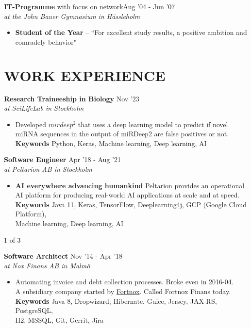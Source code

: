 \documentclass[overlapped]{res}
\begin{document}
\begin{resume}
{\bf  IT-Programme} with focus on network\hfill Aug '04 - Jun '07\\
{\sl at the John Bauer Gymnasium in Hässleholm}
\begin{itemize}
\itemsep -1pt
\item {\bf Student of the Year}  -- ``For excellent study results, a positive ambition and \\comradely behavior"
\end{itemize}

\section{{\sc WORK EXPERIENCE}} 

{\bf Research Traineeship in Biology} \hfill Nov '23\\
{\sl at SciLifeLab in Stockholm}
\begin{itemize}
\itemsep -1pt
\item Developed \href{https://github.com/jontejj/mirdeepsquared}{$mirdeep^2$} that uses a deep learning model to predict if novel miRNA sequences in the output of miRDeep2 are false positives or not.
\\{\bf Keywords} Python, Keras, Machine learning, Deep learning, AI
\end{itemize}
 

{\bf Software Engineer} \hfill Apr '18 - Aug '21 \\
{\sl at Peltarion AB in Stockholm}
\begin{itemize}
\itemsep -1pt
\item {\bf AI everywhere advancing humankind} Peltarion provides an operational AI platform for producing real-world AI applications at scale and at speed.
\\{\bf Keywords} Java 11, Keras, TensorFlow, Deeplearning4j, GCP (Google Cloud Platform),
\\Machine learning, Deep learning, AI
\end{itemize}

\vspace{0.8cm}
\centerline{1 of 3}
\newpage

{\bf Software Architect} \hfill Nov '14 - Apr '18 \\
{\sl at Nox Finans AB in Malmö}
\begin{itemize}
\itemsep -1pt
\item Automating invoice and debt collection processes. Broke even in 2016-04. 
\\A subsidiary company started by \href{http://www.fortnox.se/}{Fortnox}. Called Fortnox Finans today.
\\{\bf Keywords} Java 8, Dropwizard, Hibernate, Guice, Jersey, JAX-RS, PostgreSQL,
\\H2, MSSQL, Git, Gerrit, Jira
\end{itemize}


\end{resume}
\end{document}
